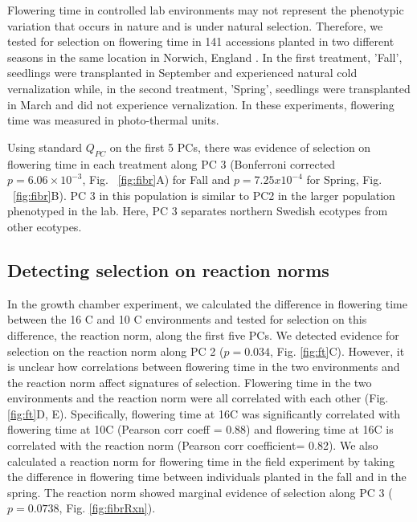 \documentclass[11pt,letterpaper]{article}
\begin{document}
Flowering time in controlled lab environments may not represent the phenotypic variation that occurs in nature and is under natural selection.
Therefore, we tested for selection on flowering time in 141 accessions planted in two different seasons in the same location in Norwich, England \citep{fournier2011map, wilczek2009effects}.
In the first treatment, 'Fall', seedlings were transplanted in September and experienced natural cold vernalization while, in the second treatment, 'Spring', seedlings were transplanted in March and did not experience vernalization. In these experiments, flowering time was measured in photo-thermal units.

Using standard $Q_{PC}$ on the first 5 PCs, there was evidence of selection on flowering time in each treatment along PC 3 (Bonferroni corrected $p = 6.06 \times 10^{-3}$, Fig. ~\ref{fig:fibr}A) for Fall and $p = 7.25 x 10^{-4}$ for Spring, Fig. ~\ref{fig:fibr}B).
PC 3 in this population is similar to PC2 in the larger population phenotyped in the lab. Here, PC 3 separates northern Swedish ecotypes from other ecotypes.

 
\subsection*{Detecting selection on reaction norms}
In the growth chamber experiment, we calculated the difference in flowering time between the  16 \degree C and 10 \degree C environments and tested for selection on this difference, the reaction norm, along the first five PCs.
We detected evidence for selection on the reaction norm along PC 2 ($p = 0.034$, Fig. \ref{fig:ft}C).
However, it is unclear how correlations between flowering time in the two environments and the reaction norm affect signatures of selection.
Flowering time in the two environments and the reaction norm were all correlated with each other (Fig. \ref{fig:ft}D, E).
Specifically, flowering time at 16\degree C was significantly correlated with flowering time at 10\degree C (Pearson corr coeff = 0.88) and flowering time at 16\degree C is correlated with the reaction norm (Pearson corr coefficient= 0.82).
We also calculated a reaction norm for flowering time in the field experiment by taking the difference in flowering time between individuals planted in the fall and in the spring.
The reaction norm showed marginal evidence of selection along PC 3 ($p = 0.0738$, Fig. \ref{fig:fibrRxn}). 
\end{document}
